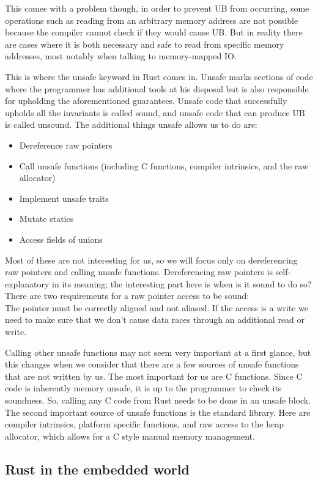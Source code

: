 This comes with a problem though, in order to prevent UB from occurring,
some operations such as reading from an arbitrary memory address are not possible
because the compiler cannot check if they would cause UB.
But in reality there are cases where it is both necessary and safe to read from specific memory addresses,
most notably when talking to memory-mapped IO.

This is where the unsafe keyword in Rust comes in.
Unsafe marks sections of code where the programmer has additional tools at his disposal but is also responsible for upholding the aforementioned guarantees.
Unsafe code that successfully upholds all the invariants is called sound, and unsafe code that can produce UB is called unsound.
The additional things unsafe allows us to do are:
\begin{itemize}
    \item Dereference raw pointers
    \item Call unsafe functions (including C functions, compiler intrinsics, and the raw allocator)
    \item Implement unsafe traits
    \item Mutate statics
    \item Access fields of unions
\end{itemize}

Most of these are not interesting for us, so we will focus only on dereferencing raw pointers and calling unsafe functions.
Dereferencing raw pointers is self-explanatory in its meaning; the interesting part here is when is it sound to do so?
There are two requirements for a raw pointer access to be sound:\\
The pointer must be correctly aligned and not aliased.
If the access is a write we need to make sure that we don't cause data races through an additional read or write.

Calling other unsafe functions may not seem very important at a first glance,
but this changes when we consider that there are a few sources of unsafe functions that are not written by us.
The most important for us are C functions.
Since C code is inherently memory unsafe, it is up to the programmer to check its soundness.
So, calling any C code from Rust needs to be done in an unsafe block.
The second important source of unsafe functions is the standard library.
Here are compiler intrinsics, platform specific functions, and raw access to the heap allocator, which allows for a C style manual memory management.

\subsection{Rust in the embedded world}
\label{sec:background:rust:embedded}

